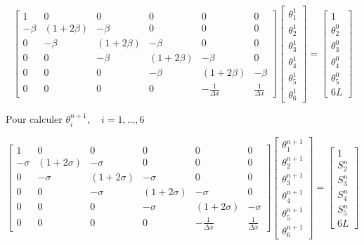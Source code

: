 \documentclass[10pt]{article}
\begin{document}
\[
\left[\begin{array}{cccccc}
1 & 0 & 0 & 0 & 0 & 0 \\
-\beta & (1+2 \beta) & -\beta & 0 & 0 & 0 \\
0 & -\beta & (1+2 \beta) & -\beta & 0 & 0 \\
0 & 0 & -\beta & (1+2 \beta) & -\beta & 0 \\
0 & 0 & 0 & -\beta & (1+2 \beta) & -\beta \\
0 & 0 & 0 & 0 & -\frac{1}{\Delta x} & \frac{1}{\Delta x}
\end{array}\right]\left[\begin{array}{c}
\theta_{1}^{1} \\
\theta_{2}^{1} \\
\theta_{3}^{1} \\
\theta_{4}^{1} \\
\theta_{5}^{1} \\
\theta_{6}^{1}
\end{array}\right]=\left[\begin{array}{c}
1 \\
\theta_{2}^{0} \\
\theta_{3}^{0} \\
\theta_{4}^{0} \\
\theta_{5}^{0} \\
6 L
\end{array}\right]
\]

Pour calculer \(\theta_{i}^{n+1}, \quad i=1, \ldots, 6\)

\[
\left[\begin{array}{cccccc}
1 & 0 & 0 & 0 & 0 & 0 \\
-\sigma & (1+2 \sigma) & -\sigma & 0 & 0 & 0 \\
0 & -\sigma & (1+2 \sigma) & -\sigma & 0 & 0 \\
0 & 0 & -\sigma & (1+2 \sigma) & -\sigma & 0 \\
0 & 0 & 0 & -\sigma & (1+2 \sigma) & -\sigma \\
0 & 0 & 0 & 0 & -\frac{1}{\Delta x} & \frac{1}{\Delta x}
\end{array}\right]\left[\begin{array}{c}
\theta_{1}^{n+1} \\
\theta_{2}^{n+1} \\
\theta_{3}^{n+1} \\
\theta_{4}^{n+1} \\
\theta_{5}^{n+1} \\
\theta_{6}^{n+1}
\end{array}\right]=\left[\begin{array}{c}
1 \\
S_{2}^{n} \\
S_{3}^{n} \\
S_{4}^{n} \\
S_{5}^{n} \\
6 L
\end{array}\right]
\]
\end{document}
